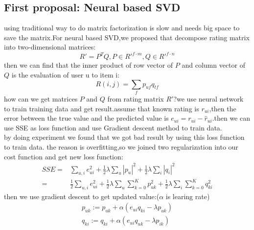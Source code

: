 \documentclass{acmtog} %
\begin{document}
\subsection{First proposal: Neural based SVD}
using traditional way to do matrix factorization is slow and needs big space to save the matrix.For neural based SVD,we proposed that decompose rating matrix into two-dimensional matrices:
\begin{equation}
	R'=P^TQ,P\in R'^{f\cdot m},Q \in R'^{f\cdot n}
\end{equation} 
then we can find that the inner product of row vector of $P$ and column vector of $Q$ is the evaluation of user u to item i:
\begin{equation}
	R(i,j)=\sum_fp_{uf}q_{tf}
\end{equation}
how can we get matrices $P$ and  $Q$ from rating matrix $R'$?we use neural network to train training data and get result.assume  that known rating is $r_{ui}$,then the error between the true value and the predicted value is $e_{ui}=r_{ui}-\hat r_{ui}$.then we can use SSE as loss function and use Gradient descent method to train data.\\
by doing experiment we found that we got bad result by using this loss function to train data. the reason is overfitting,so we joined two regularization into our cost function and get new loss function:
\begin{equation}
\begin{aligned}
	SSE=&\sum_{u,i}e_{ui}^2+\frac{1}{2}\lambda \sum_u|p_u|^2+\frac{1}{2}\lambda \sum_i|q_i|^2\\
	=&\frac{1}{2}\sum_{u,i}e_{ui}^2+\frac{1}{2}\lambda \sum_{u}\sum_{k=0}^Kp^2_{uk}+\frac{1}{2}\lambda \sum_i\sum_{k=0}^Kq_{ki}^2
\end{aligned}
\end{equation}
then we use gradient descent to get updated value:($\alpha$ is learing rate)
\begin{equation}
\begin{split}
	p_{uk}:=p_{uk}+\alpha (e_{ui}q_{ki}-\lambda p_{uk})\\
	q_{ki}:=q_{ki}+\alpha (e_{ui}q_{uk}-\lambda p_{ik})
\end{split}
\end{equation}
\end{document}
